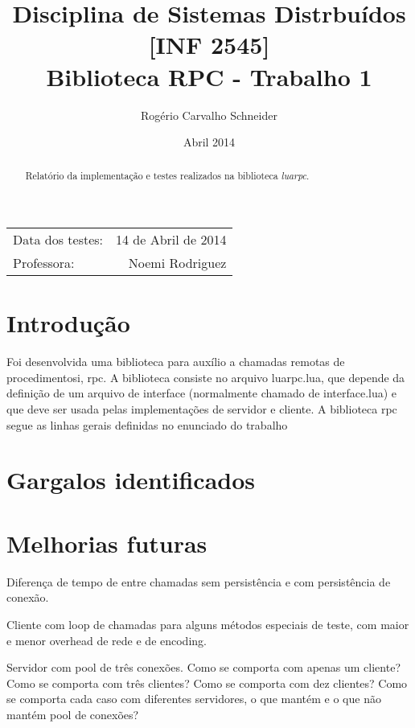 \documentclass[11pt]{article}
\begin{document}
\title{Disciplina de Sistemas Distrbuídos [INF 2545] \\ Biblioteca RPC -
Trabalho 1}
\author{Rogério Carvalho Schneider}
\date{Abril 2014}
\maketitle

\begin{center}
\begin{tabular}{l r}
Data dos testes: & 14 de Abril de 2014 \\
Professora: & Noemi Rodriguez
\end{tabular}
\end{center}

\begin{abstract}
Relatório da implementação e testes realizados na biblioteca \textit{luarpc}.
\end{abstract}

\doublespacing

\section{Introdução}\label{sec:introduction}

Foi desenvolvida uma biblioteca para auxílio a chamadas remotas de
procedimentosi, \gls{rpc}. A biblioteca consiste no arquivo luarpc.lua, que depende da
definição de um arquivo de interface (normalmente chamado de interface.lua) e
que deve ser usada pelas implementações de servidor e cliente.
A biblioteca \gls{rpc} segue as linhas gerais definidas no enunciado do trabalho
\cite{trab1}

\section{Gargalos identificados}\label{sec:bottle}

\section{Melhorias futuras}\label{sec:future}

Diferença de tempo de entre chamadas sem persistência e com persistência de
conexão.

Cliente com loop de chamadas para alguns métodos especiais de teste, com maior
e menor overhead de rede e de encoding.

Servidor com pool de três conexões.
Como se comporta com apenas um cliente?
Como se comporta com três clientes?
Como se comporta com dez clientes?
Como se comporta cada caso com diferentes servidores, o que mantém e o que não
mantém pool de conexões?
\end{document}

